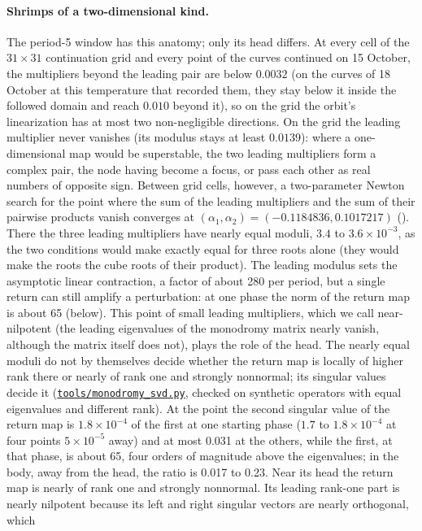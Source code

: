 \documentclass[11pt,letterpaper]{article}
\newcommand{\repourl}{https://github.com/tdj28/neural-shrimp}
\newcommand{\reporef}{arxiv-v1}
\newcommand{\repo}[1]{\href{\repourl/blob/\reporef/#1}{\nolinkurl{#1}}}
\begin{document}
\paragraph{Shrimps of a two-dimensional kind.} The period-5 window has this anatomy; only its head differs. At
every cell of the $31\times31$ continuation grid and every point of the curves continued on 15 October, the
multipliers beyond the leading pair are below $0.0032$ (on the curves of 18 October at this temperature that recorded
them, they stay below it inside the followed domain and reach $0.010$ beyond it), so on the grid the orbit's linearization has at
most two non-negligible directions. On the grid the leading multiplier never
vanishes (its modulus stays at least $0.0139$): where a one-dimensional map would be superstable, the two leading
multipliers form a complex pair, the node having become a focus, or pass each other as real numbers of opposite sign.
Between grid cells, however, a two-parameter Newton search for the point where the sum of the leading multipliers and
the sum of their pairwise products vanish converges at $(\alpha_1,\alpha_2)=(-0.1184836,0.1017217)$
(). There the three leading multipliers have nearly equal moduli, $3.4$ to
$3.6\times10^{-3}$, as the two conditions would make exactly equal for three roots alone (they would make the roots
the cube roots of their product). The leading modulus sets the asymptotic linear contraction, a factor of about 280
per period, but a single return can still amplify a perturbation: at one phase the norm of the return map is about 65
(below). This point of small leading multipliers, which we call near-nilpotent (the leading eigenvalues of the
monodromy matrix nearly vanish, although the matrix itself does not), plays the role of the head. The nearly equal
moduli do not by themselves decide whether the return map is locally of higher rank there or nearly of rank one and strongly
nonnormal; its singular values decide it (\repo{tools/monodromy_svd.py}, checked on synthetic operators with equal
eigenvalues and different rank). At the point the second singular value of the return map is $1.8\times10^{-4}$ of the
first at one starting phase ($1.7$ to $1.8\times10^{-4}$ at four points $5\times10^{-5}$ away) and at most 0.031 at the
others, while the first, at that phase, is about 65, four orders of magnitude above the eigenvalues; in the body, away from the
head, the ratio is 0.017 to 0.23. Near its head the return map is nearly of rank one and strongly nonnormal. Its
leading rank-one part is nearly nilpotent because its left and right singular vectors are nearly orthogonal, which
\end{document}
